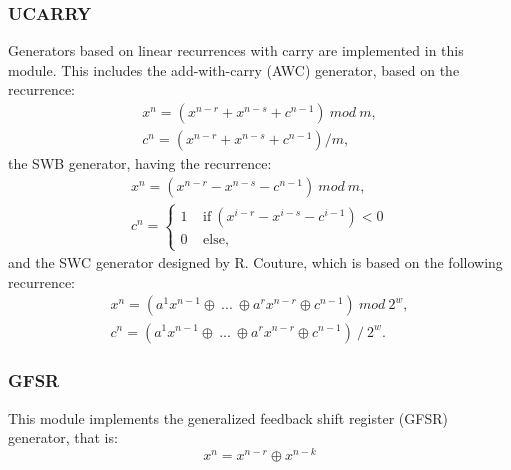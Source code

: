 \subsubsection{UCARRY}
Generators based on linear recurrences with carry are implemented in this module. This includes the add-with-carry (AWC) generator, based on the recurrence:
\begin{equation}
\label{AWC}
\begin{array}{l}
x^n = (x^{n-r} + x^{n-s} + c^{n-1})~mod~m, \\
c^n= (x^{n-r} + x^{n-s} + c^{n-1}) / m, \end{array}\end{equation}
the SWB generator, having the recurrence:
\begin{equation}
\label{SWB}
\begin{array}{l}
x^n = (x^{n-r} - x^{n-s} - c^{n-1})~mod~m, \\
c^n=\left\{
\begin{array}{l}
1 ~~~~~\text{if}~ (x^{i-r} - x^{i-s} - c^{i-1})<0\\
0 ~~~~~\text{else},\end{array} \right. \end{array}\end{equation}
and the SWC generator designed by R. Couture, which is based on the following recurrence:
\begin{equation}
\label{SWC}
\begin{array}{l}
x^n = (a^1x^{n-1} \oplus ~...~ \oplus a^rx^{n-r} \oplus c^{n-1}) ~ mod ~ 2^w, \\
c^n = (a^1x^{n-1} \oplus ~...~ \oplus a^rx^{n-r} \oplus c^{n-1}) ~ / ~ 2^w. \end{array}\end{equation}

\subsubsection{GFSR}
This module implements the generalized feedback shift register (GFSR) generator, that is:
\begin{equation}
x^n = x^{n-r} \oplus x^{n-k}
\label{GFSR}
\end{equation}

